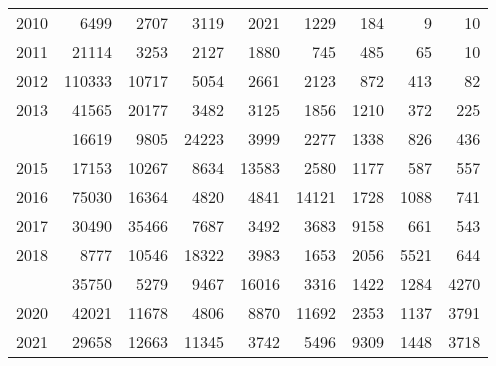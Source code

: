 \documentclass[
]{article}
\begin{document}
\begin{longtable}[t]{lrrrrrrrr}
2010 & 6499 & 2707 & 3119 & 2021 & 1229 & 184 & 9 & 10\\
2011 & 21114 & 3253 & 2127 & 1880 & 745 & 485 & 65 & 10\\
2012 & 110333 & 10717 & 5054 & 2661 & 2123 & 872 & 413 & 82\\
2013 & 41565 & 20177 & 3482 & 3125 & 1856 & 1210 & 372 & 225\\
\addlinespace
2014 & 16619 & 9805 & 24223 & 3999 & 2277 & 1338 & 826 & 436\\
2015 & 17153 & 10267 & 8634 & 13583 & 2580 & 1177 & 587 & 557\\
2016 & 75030 & 16364 & 4820 & 4841 & 14121 & 1728 & 1088 & 741\\
2017 & 30490 & 35466 & 7687 & 3492 & 3683 & 9158 & 661 & 543\\
2018 & 8777 & 10546 & 18322 & 3983 & 1653 & 2056 & 5521 & 644\\
\addlinespace
2019 & 35750 & 5279 & 9467 & 16016 & 3316 & 1422 & 1284 & 4270\\
2020 & 42021 & 11678 & 4806 & 8870 & 11692 & 2353 & 1137 & 3791\\
2021 & 29658 & 12663 & 11345 & 3742 & 5496 & 9309 & 1448 & 3718\\*
\end{longtable}
\end{document}
